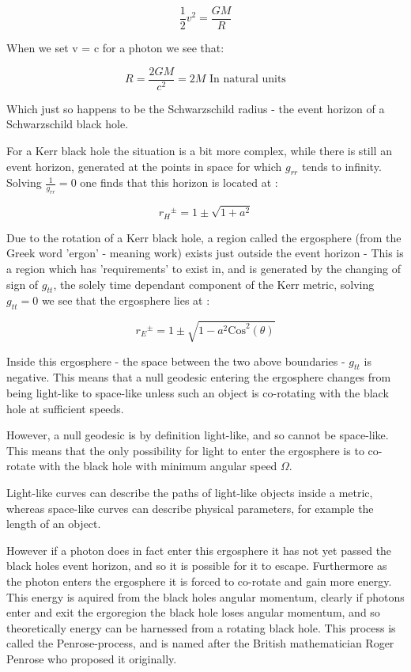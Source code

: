 \documentclass[oneside,openright,frontopenright, singlespacing]{dmathesis}
\begin{document}
	\[\frac{1}{2}v^2 = \frac{GM}{R}\]

\vspace{1em}
	When we set v = c for a photon we see that:

	\[R = \frac{2GM}{c^2} = 2M \mbox{ In natural units}\]

\vspace{1em}
	Which just so happens to be the Schwarzschild radius - the event horizon of a Schwarzschild black hole.

\vspace{1em}
	For a Kerr black hole the situation is a bit more complex, while there is still an event horizon, generated at the points in space for which $g_{rr}$ tends to infinity. Solving $\frac{1}{g_{rr}} = 0$ one finds that this horizon is located at \cite{kerrMetric}:

	\[{r_{H}}^{\pm} = 1\pm\sqrt{1+a^2}\]

\vspace{1em}
	Due to the rotation of a Kerr black hole, a region called the ergosphere (from the Greek word 'ergon' - meaning work) exists just outside the event horizon - This is a region which has 'requirements' to exist in, and is generated by the changing of sign of $g_{tt}$, the solely time dependant component of the Kerr metric, solving $g_{tt} = 0$ we see that the ergosphere lies at \cite{kerrMetric}:

	\[{r_{E}}^{\pm} = 1\pm\sqrt{1-a^2\mbox{Cos}^2(\theta)}\]

\vspace{1em}
	Inside this ergosphere - the space between the two above boundaries - $g_{tt}$ is negative. This means that a null geodesic entering the ergosphere changes from being light-like to space-like unless such an object is co-rotating with the black hole at sufficient speeds.

\vspace{1em}
	However, a null geodesic is by definition light-like, and so cannot be space-like. This means that the only possibility for light to enter the ergosphere is to co-rotate with the black hole with minimum angular speed $\Omega$.

\vspace{1em}
	Light-like curves can describe the paths of light-like objects inside a metric, whereas space-like curves can describe physical parameters, for example the length of an object.

\vspace{1em}
	However if a photon does in fact enter this ergosphere it has not yet passed the black holes event horizon, and so it is possible for it to escape. Furthermore as the photon enters the ergosphere it is forced to co-rotate and gain more energy. This energy is aquired from the black holes angular momentum, clearly if photons enter and exit the ergoregion the black hole loses angular momentum, and so theoretically energy can be harnessed from a rotating black hole. This process is called the Penrose-process, and is named after the British mathematician Roger Penrose who proposed it originally.
\end{document}
